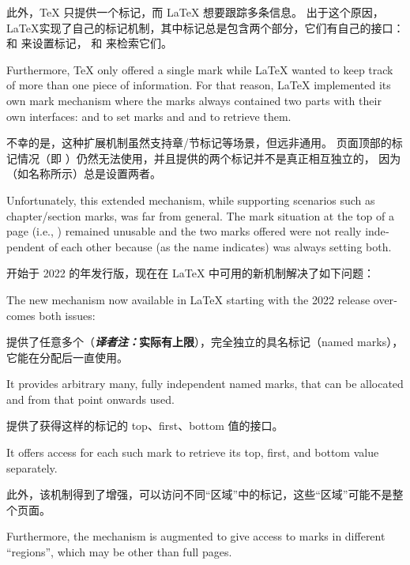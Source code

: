 \documentclass{ltnews}
\def\TEX{\TeX}
\def\LATEX{\LaTeX}
\newcommand{\itransnote}[1]{（{\bfseries \textit{译者注：}#1}）}
\begin{document}
此外，\TEX{} 只提供一个标记，而 \LATEX{} 想要跟踪多条信息。
出于这个原因，\LATEX 实现了自己的标记机制，其中标记总是包含两个部分，它们有自己的接口：
 和  来设置标记， 和  来检索它们。

\begin{english}
Furthermore, \TeX{} only offered a single mark while \LaTeX{} wanted to
keep track of more than one piece of information.  For that reason,
\LaTeX{} implemented its own mark mechanism where the marks always
contained two parts with their own interfaces:  and
 to set marks and  and  to
retrieve them.
\end{english}

不幸的是，这种扩展机制虽然支持章/节标记等场景，但远非通用。
页面顶部的标记情况（即 ）仍然无法使用，并且提供的两个标记并不是真正相互独立的，
因为 （如名称所示）总是设置两者。

\begin{english}
Unfortunately, this extended mechanism, while supporting scenarios such
as chapter/section marks, was far from general. The mark
situation at the top of a page (i.e., ) remained
unusable and the two marks offered were not really independent of
each other because  (as the name indicates) was
always setting both.
\end{english}

开始于 2022 的年发行版，现在在 \LaTeX{} 中可用的新机制解决了如下问题：

\begin{english}
The new mechanism now available in \LaTeX{} starting with the 2022
release overcomes both issues:
\end{english}

\begin{itemize}
\item 提供了任意多个\itransnote{实际有上限}，完全独立的具名标记（named marks），它能在分配后一直使用。
\begin{english}
\item
  It provides arbitrary many, fully independent named marks, that
  can be allocated and from that point onwards used.
\end{english}
\item 提供了获得这样的标记的 top、first、bottom 值的接口。
\begin{english}
\item
  It offers access for each such mark to retrieve its top,
  first, and bottom value separately.
\end{english}
\item 此外，该机制得到了增强，可以访问不同“区域”中的标记，这些“区域”可能不是整个页面。
\begin{english}
\item
  Furthermore, the mechanism is augmented to give access to marks
  in different ``regions'', which may be other than full pages.
\end{english}
\end{itemize}
\end{document}
